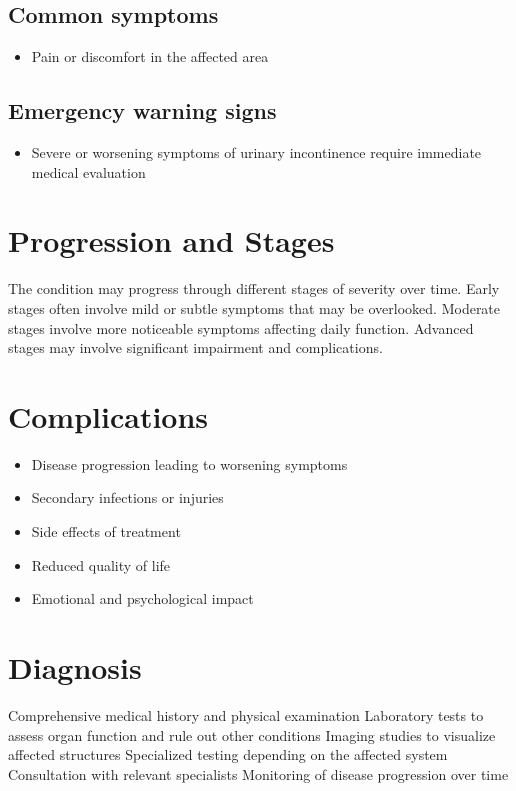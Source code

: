 \subsection{Common symptoms}
\begin{itemize}[noitemsep]
  \item Pain or discomfort in the affected area
  \end{itemize}

\subsection{Emergency warning signs}
\begin{itemize}[noitemsep]
  \item Severe or worsening symptoms of urinary incontinence require immediate medical evaluation
\end{itemize}
\section{Progression and Stages}
The condition may progress through different stages of severity over time. Early stages often involve mild or subtle symptoms that may be overlooked. Moderate stages involve more noticeable symptoms affecting daily function. Advanced stages may involve significant impairment and complications.
\section{Complications}
\begin{itemize}[noitemsep]
  \item Disease progression leading to worsening symptoms
  \item Secondary infections or injuries
  \item Side effects of treatment
  \item Reduced quality of life
  \item Emotional and psychological impact
\end{itemize}
\section{Diagnosis}
Comprehensive medical history and physical examination Laboratory tests to assess organ function and rule out other conditions Imaging studies to visualize affected structures Specialized testing depending on the affected system Consultation with relevant specialists Monitoring of disease progression over time


